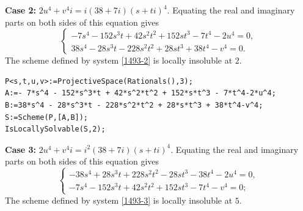 \documentclass[a4paper,12pt,english,reqno]{amsart}
\begin{document}
{\bf Case 2:} $2u^4+v^4i=i(38+7i)(s+ti)^4$. Equating the real and imaginary parts on both sides of this equation gives
\begin{equation}\label{1493-2}
\begin{cases}
-7s^4 - 152s^3t + 42s^2t^2 + 152st^3 - 7t^4 - 2u^4=0,\\
38s^4 - 28s^3t - 228s^2t^2 + 28st^3 + 38t^4 - v^4=0.
\end{cases}
\end{equation}
The scheme defined by system \eqref{1493-2} is locally insoluble at $2$.

\begin{lstlisting}
P<s,t,u,v>:=ProjectiveSpace(Rationals(),3);
A:=- 7*s^4 - 152*s^3*t + 42*s^2*t^2 + 152*s*t^3 - 7*t^4-2*u^4;
B:=38*s^4 - 28*s^3*t - 228*s^2*t^2 + 28*s*t^3 + 38*t^4-v^4;
S:=Scheme(P,[A,B]);
IsLocallySolvable(S,2);
\end{lstlisting}

{\bf Case 3:} $2u^4+v^4i=i^2(38+7i)(s+ti)^4$. Equating the real and imaginary parts on both sides of this equation gives
\begin{equation}\label{1493-3}
\begin{cases}
- 38s^4 + 28s^3t +228s^2t^2 - 28st^3 - 38t^4-2u^4=0,\\
-7s^4 - 152s^3t + 42s^2t^2 + 152st^3 - 7t^4-v^4=0;
\end{cases}
\end{equation}
The scheme defined by system \eqref{1493-3} is locally insoluble at $5$.

\end{document}
